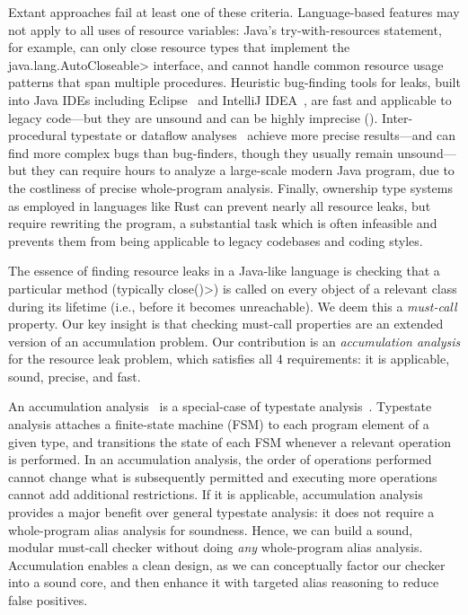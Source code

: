 Extant approaches fail at least one of these criteria.
Language-based features may not apply to all uses of resource variables:
Java's try-with-resources statement, for example, can
only close resource types that implement the \<java.lang.AutoCloseable> interface,
and cannot handle
common resource usage patterns that span multiple procedures. 
Heuristic bug-finding tools for leaks, built into Java IDEs including
Eclipse~\cite{ecj-resource-leak} and IntelliJ
IDEA~\cite{idea-resource-leak}, 
are fast and applicable to legacy
code---but they are unsound and can be highly imprecise
().  
Inter-procedural typestate or dataflow analyses~\cite{TorlakC10,zuo2019grapple}
achieve more precise
results---and
can find more complex bugs than bug-finders, though they usually remain
unsound---but
they can require hours to analyze a large-scale modern Java program, due
to the costliness of precise whole-program analysis.
Finally, ownership type
systems~\cite{clarke2013ownership} as employed in languages like Rust
 can prevent nearly all resource leaks, but require
rewriting the program, a substantial task which is often infeasible
and prevents them from being applicable to legacy codebases and coding styles.

The essence of finding resource leaks in a Java-like language is
checking that a particular method (typically \<close()>) is called on
every object of a relevant class during its lifetime (i.e., before it
becomes unreachable).  We deem this a \emph{must-call} property.  Our
key insight is that checking must-call properties are an extended version of an
accumulation problem.
Our contribution is an \emph{accumulation analysis} for the resource leak
problem, which satisfies all 4 requirements:  it is applicable,
sound, precise, and fast.

An accumulation analysis~\cite{KelloggRSSE2020}
is a special-case of typestate analysis~\cite{StromY86}.
Typestate analysis attaches a finite-state machine (FSM)
to each program element of a given type, and transitions the state of each
FSM whenever a relevant operation is performed.
In an accumulation analysis,
the order of operations performed cannot change what is subsequently
permitted and executing more operations cannot add additional
restrictions.  If it is applicable, accumulation analysis provides a major
benefit over general typestate analysis: it does not
require a whole-program alias analysis for soundness.
Hence, we can build a sound, modular must-call
checker without doing \emph{any} whole-program alias analysis.
Accumulation enables a clean design, as we
can conceptually factor our checker into a sound core, and
then enhance it with
targeted alias reasoning to reduce false positives.

